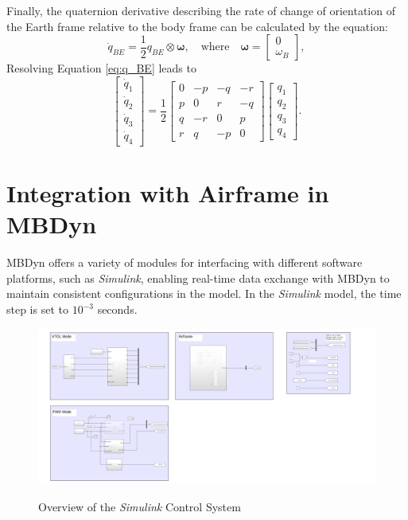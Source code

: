 Finally, the quaternion derivative describing the rate of change of orientation of the Earth frame relative to the body frame can be calculated by the equation:
\begin{equation}
\dot{q}_{BE} = \frac{1}{2} q_{BE} \otimes \boldsymbol{\omega}, \quad \text{where} \quad \boldsymbol{\omega} = \begin{bmatrix} 0 \\ \omega_B \end{bmatrix}, \label{eq:q_BE}
\end{equation}
Resolving Equation \eqref{eq:q_BE} leads to
\begin{equation}
    \begin{bmatrix} 
        \dot{q}_1 \\ 
        \dot{q}_2 \\ 
        \dot{q}_3 \\ 
        \dot{q}_4 
    \end{bmatrix} = \frac{1}{2} \begin{bmatrix} 
        0 & -p & -q & -r \\ 
        p & 0 & r & -q \\ 
        q & -r & 0 & p \\ 
        r & q & -p & 0 
    \end{bmatrix} \begin{bmatrix} 
        q_1 \\ 
        q_2 \\ 
        q_3 \\ 
        q_4 
    \end{bmatrix}.    
\end{equation}

\section{Integration with Airframe in MBDyn}

MBDyn offers a variety of modules for interfacing with different software platforms, such as \textit{Simulink}, enabling real-time data exchange with MBDyn to maintain consistent configurations in the model. In the \textit{Simulink} model, the time step is set to \(10^{-3}\) seconds.

\begin{figure}
    \centering
    \includegraphics[width=1\linewidth]{Images/SImulink_overview.png}
    \label{fig:Simulink_overview}
    \caption{Overview of the \textit{Simulink} Control System}
\end{figure}

